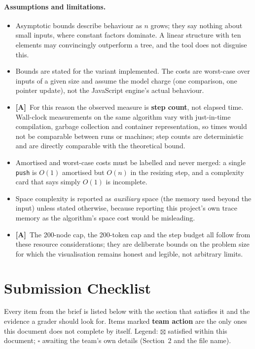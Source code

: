 \documentclass[11pt,a4paper]{article}
\newcommand{\A}{\textcolor{asmc}{\textbf{[A]}}}     %
\newcommand{\ct}[1]{\texttt{#1}}
\begin{document}
\paragraph{Assumptions and limitations.}
\begin{itemize}[leftmargin=1.6em,itemsep=2pt]
  \item Asymptotic bounds describe behaviour as $n$ grows; they say nothing about small
        inputs, where constant factors dominate. A linear structure with ten elements may
        convincingly outperform a tree, and the tool does not disguise this.
  \item Bounds are stated for the variant implemented. The costs are worst-case over inputs
        of a given size and assume the model charge (one comparison, one pointer update),
        not the JavaScript engine's actual behaviour.
  \item \A\ For this reason the observed measure is \textbf{step count}, not elapsed time.
        Wall-clock measurements on the same algorithm vary with just-in-time compilation,
        garbage collection and container representation, so times would not be comparable
        between runs or machines; step counts are deterministic and are directly comparable
        with the theoretical bound.
  \item Amortised and worst-case costs must be labelled and never merged: a single
        \ct{push} is $O(1)$ amortised but $O(n)$ in the resizing step, and a complexity card
        that says simply $O(1)$ is incomplete.
  \item Space complexity is reported as \emph{auxiliary} space (the memory used beyond the
        input) unless stated otherwise, because reporting this project's own trace memory as
        the algorithm's space cost would be misleading.
  \item \A\ The 200-node cap, the 200-token cap and the step budget all follow from these
        resource considerations; they are deliberate bounds on the problem size for which the
        visualisation remains honest and legible, not arbitrary limits.
\end{itemize}

\section{Submission Checklist}

Every item from the brief is listed below with the section that satisfies it and the
evidence a grader should look for. Items marked \textbf{team action} are the only ones this
document does not complete by itself. Legend: $\boxtimes$ satisfied within this document;
$\square$ awaiting the team's own details (Section~2 and the file name).
\end{document}
